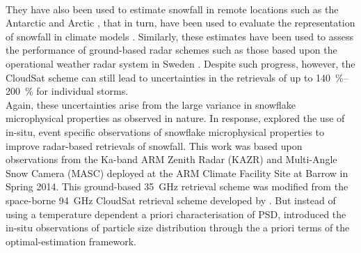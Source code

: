 \\
They have also been used to estimate snowfall in remote locations such as the Antarctic and Arctic \citep{palerme_how_2014,kulie_shallow_2016}, that in turn, have been used to evaluate the representation of snowfall in climate models \citep{palerme_evaluation_2017,christensen_arctic_2016}. Similarly, these estimates have been used to assess the performance of ground-based radar schemes such as those based upon the operational weather radar system in Sweden \citep{norin_intercomparison_2015}. Despite such progress, however, the CloudSat scheme can still lead to uncertainties in the retrievals of up to \SIrange{140}{200}{\percent} \citep{wood_estimation_2011} for individual storms.
\\
Again, these uncertainties arise from the large variance in snowflake microphysical  properties as observed in nature. In response, \citet{cooper_variational_2017} explored the use of in-situ, event specific  observations of snowflake microphysical properties to improve radar-based retrievals of snowfall.  This work was based upon observations from the Ka-band ARM Zenith Radar (KAZR) and Multi-Angle Snow Camera (MASC) deployed at the ARM Climate Facility Site at Barrow in Spring 2014. This ground-based \SI{35}{\giga\hertz} retrieval scheme was modified from the space-borne \SI{94}{\giga\hertz} CloudSat retrieval scheme developed by \citet{wood_estimation_2011}. But instead of using a temperature dependent a priori characterisation of PSD, \citeauthor{cooper_variational_2017} introduced the in-situ observations of particle size distribution through the a priori terms of the optimal-estimation framework. 

